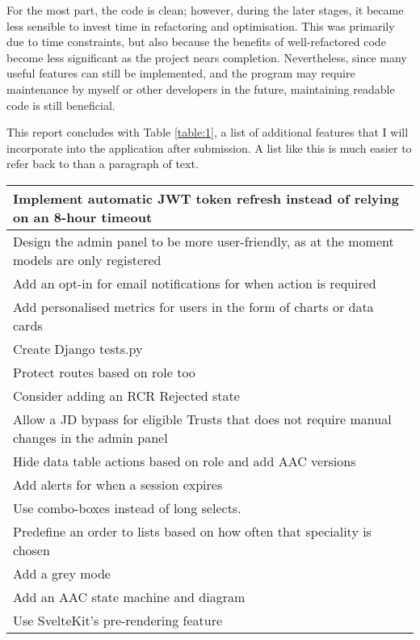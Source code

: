 For the most part, the code is clean; however, during the later stages, it became less sensible to invest time in refactoring and optimisation. This was primarily due to time constraints, but also because the benefits of well-refactored code become less significant as the project nears completion. Nevertheless, since many useful features can still be implemented, and the program may require maintenance by myself or other developers in the future, maintaining readable code is still beneficial.

This report concludes with Table \ref{table:1}, a list of additional features that I will incorporate into the application after submission. A list like this is much easier to refer back to than a paragraph of text.

\def\arraystretch{1.22}
\begin{table}[h!]
\small
\vspace{-20pt}
\centering
\begin{tabular}{||m{}||}
   \hline
 Implement automatic JWT token refresh instead of relying on an 8-hour timeout\\ 
\hline
 Design the admin panel to be more user-friendly, as at the moment models are only registered\\
\hline
 Add an opt-in for email notifications for when action is required\\
\hline
 Add personalised metrics for users in the form of charts or data cards\\
\hline
 Create Django tests.py\\
\hline
 Protect routes based on role too\\
\hline
 Consider adding an RCR Rejected state\\
\hline
 Allow a JD bypass for eligible Trusts that does not require manual changes in the admin panel\\ 
\hline
 Hide data table actions based on role and add AAC versions\\ 
\hline
 Add alerts for when a session expires\\ 
\hline
 Use combo-boxes instead of long selects.\\ 
\hline
  Predefine an order to lists based on how often that speciality is chosen\\ 
\hline
 Add a grey mode\\ 
\hline
 Add an AAC state machine and diagram\\ 
\hline
 Use SvelteKit's pre-rendering feature\\ 
\hline

\end{tabular}
\end{table}
